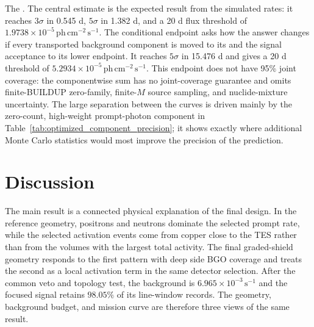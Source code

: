 \documentclass[11pt]{article}
\newcommand{\phcms}{\ensuremath{\,\mathrm{ph\,cm^{-2}\,s^{-1}}}}
\newcommand{\cps}{\ensuremath{\,\mathrm{s^{-1}}}}
\begin{document}
The . The central estimate is the expected
result from the simulated rates: it reaches $3\sigma$ in 0.545 d, $5\sigma$ in
1.382 d, and a 20 d flux threshold of $1.9738\times10^{-5}\phcms$. The
conditional endpoint asks how the answer changes if every transported background
component is moved to its  and the signal acceptance
to its lower endpoint. It reaches $5\sigma$ in 15.476 d and gives a 20 d threshold
of $5.2934\times10^{-5}\phcms$. This endpoint does not have 95\% joint coverage:
the componentwise sum has no joint-coverage guarantee and omits finite-BUILDUP
zero-family, finite-$M$ source sampling, and nuclide-mixture uncertainty. The large separation between the curves is driven
mainly by the zero-count, high-weight prompt-photon component in
Table~\ref{tab:optimized_component_precision}; it shows exactly where additional
Monte Carlo statistics would most improve the precision of the prediction.

\section{Discussion}
\label{sec:discussion}

The main result is a connected physical explanation of the final design. In the
reference geometry, positrons and neutrons dominate the selected prompt rate, while
the selected activation events come from copper close to the TES rather than from
the volumes with the largest total activity. The final graded-shield geometry responds to the
first pattern with deep side BGO coverage and treats the second as a local activation
term in the same detector selection. After the common veto and topology test, the
background is $6.965\times10^{-3}\cps$ and the focused signal retains $98.05\%$
of its line-window records. The geometry, background budget, and mission curve are
therefore three views of the same result.
\end{document}
